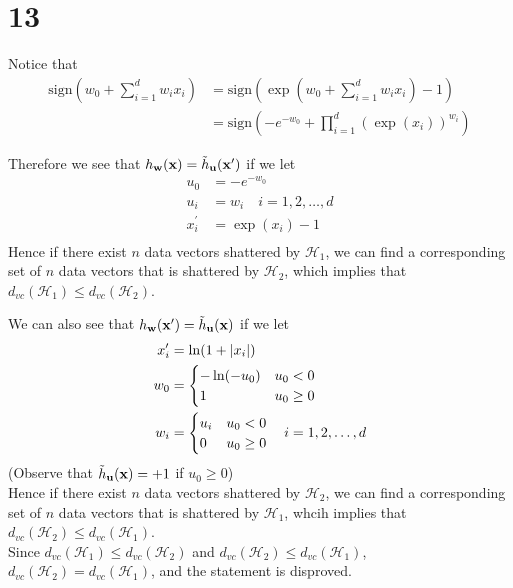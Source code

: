 \documentclass[11pt]{article}
\theoremstyle{definition}
\begin{document}
\section*{13}
Notice that 
\begin{align*}
  \text{sign}\left(w_0 + \sum^d_{i = 1}w_ix_i\right) &= \text{sign}\left(\exp\left(w_0 + \sum^d_{i = 1}w_ix_i\right) - 1\right) \\ 
  &= \text{sign}\left(-e^{-w_0} + \prod^d_{i = 1}(\exp(x_i))^{w_i}\right)
\end{align*}
\par 
Therefore we see that $h_{\vb{w}}(\vb{x}) = \tilde{h}_{\vb{u}}(\vb{x}^\prime)$ if we let 
\begin{align*}
  u_0 &= -e^{-w_0} \\ 
  u_i &= w_i \quad i = 1, 2,\dots,d \\ 
  x^\prime_i &= \exp(x_i) - 1 \\
\end{align*}
Hence if there exist $n$ data vectors shattered by $\mathcal{H}_1$, we can find a corresponding set of $n$ data vectors that is shattered by $\mathcal{H}_2$, which implies that $d_{vc}(\mathcal{H}_1) \leq d_{vc}(\mathcal{H}_2)$. \\
\par
We can also see that $h_{\vb{w}}(\vb{x^\prime}) = \tilde{h}_{\vb{u}}(\vb{x})$ if we let
\begin{align*}
  x^\prime_i &= \ln(1 + \abs{x_i}) \\ 
  w_0 &= 
  \begin{cases}
    -\ln(-u_0) & u_0 < 0 \\ 
    1 & u_0 \geq 0
  \end{cases} \\
  w_i &= 
  \begin{cases}
    u_i & u_0 < 0 \\ 
    0 & u_0 \geq 0 \\
  \end{cases}
  \quad i = 1, 2, \dots, d
\end{align*}
(Observe that $\tilde{h}_{\vb{u}}(\vb{x}) = +1$ if $u_0 \geq 0$) \\ 
Hence if there exist $n$ data vectors shattered by $\mathcal{H}_2$, we can find a corresponding set of $n$ data vectors that is shattered by $\mathcal{H}_1$, whcih implies that $d_{vc}(\mathcal{H}_2) \leq d_{vc}(\mathcal{H}_1)$. \\
Since $d_{vc}(\mathcal{H}_1) \leq d_{vc}(\mathcal{H}_2)$ and $d_{vc}(\mathcal{H}_2) \leq d_{vc}(\mathcal{H}_1)$, $d_{vc}(\mathcal{H}_2) = d_{vc}(\mathcal{H}_1)$, and the statement is disproved.
\end{document}
